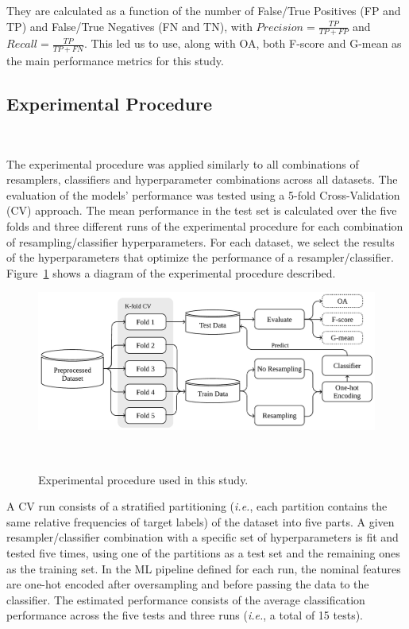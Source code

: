 \documentclass[preprint,12pt]{elsarticle}
\begin{document}
{They are calculated as a function of the number of False/True Positives (FP
and TP) and False/True Negatives (FN and TN), with $Precision =
\frac{TP}{TP+FP}$ and $Recall = \frac{TP}{TP+FN}$. This led us to use, along
with OA, both F-score and G-mean as the main performance metrics for this
study. 

\subsection{Experimental Procedure}~\label{sec:experimental_procedure}

The experimental procedure was applied similarly to all combinations of
resamplers, classifiers and hyperparameter combinations across all datasets.
The evaluation of the models' performance was tested using a 5-fold
Cross-Validation (CV) approach. The mean performance in the test set is
calculated over the five folds and three different runs of the experimental
procedure for each combination of resampling/classifier hyperparameters. For
each dataset, we select the results of the hyperparameters that optimize the
performance of a resampler/classifier. Figure~\ref{fig:experimental_procedure}
shows a diagram of the experimental procedure described.

\begin{figure}
	\centering
	\includegraphics[width=.8\linewidth]{../analysis/experimental_procedure}
    \caption{Experimental procedure used in this study.
    }~\label{fig:experimental_procedure}
\end{figure}

A CV run consists of a stratified partitioning (\textit{i.e.}, each partition
contains the same relative frequencies of target labels) of the dataset into
five parts. A given resampler/classifier combination with a specific set of
hyperparameters is fit and tested five times, using one of the partitions as a
test set and the remaining ones as the training set. In the ML pipeline
defined for each run, the nominal features are one-hot encoded after
oversampling and before passing the data to the classifier. The estimated
performance consists of the average classification performance across the five
tests and three runs (\textit{i.e.}, a total of 15 tests). 

}
\end{document}
